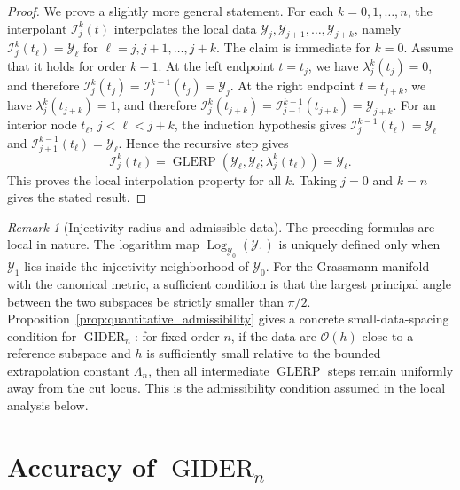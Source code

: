 \documentclass[a4paper,11pt]{article}
\newcommand{\Log}{\operatorname{Log}}
\newcommand{\GLERP}{\operatorname{GLERP}}
\newcommand{\GIDER}{\operatorname{GIDER}}
\numberwithin{equation}{section}
\theoremstyle{plain}
\theoremstyle{definition}
\theoremstyle{remark}
\newtheorem{remark}[thm]{Remark}
\begin{document}
\begin{proof}
We prove a slightly more general statement.  For each \(k=0,1,\ldots,n\), the interpolant \(\mathcal{I}_j^k(t)\) interpolates the local data \(\mathcal{Y}_j,\mathcal{Y}_{j+1},\ldots,\mathcal{Y}_{j+k}\), namely \(\mathcal{I}_j^k(t_\ell)=\mathcal{Y}_\ell\) for \(\ell=j,j+1,\ldots,j+k\).  The claim is immediate for \(k=0\).  Assume that it holds for order \(k-1\).  At the left endpoint \(t=t_j\), we have \(\lambda_j^k(t_j)=0\), and therefore \(\mathcal{I}_j^k(t_j)=\mathcal{I}_j^{k-1}(t_j)=\mathcal{Y}_j\).  At the right endpoint \(t=t_{j+k}\), we have \(\lambda_j^k(t_{j+k})=1\), and therefore \(\mathcal{I}_j^k(t_{j+k})=\mathcal{I}_{j+1}^{k-1}(t_{j+k})=\mathcal{Y}_{j+k}\).  For an interior node \(t_\ell\), \(j<\ell<j+k\), the induction hypothesis gives \(\mathcal{I}_j^{k-1}(t_\ell)=\mathcal{Y}_\ell\) and \(\mathcal{I}_{j+1}^{k-1}(t_\ell)=\mathcal{Y}_\ell\).  Hence the recursive step gives
\[
    \mathcal{I}_j^k(t_\ell)
    =
    \GLERP(\mathcal{Y}_\ell,\mathcal{Y}_\ell;\lambda_j^k(t_\ell))
    =
    \mathcal{Y}_\ell.
\]
This proves the local interpolation property for all \(k\).  Taking \(j=0\) and \(k=n\) gives the stated result.
\end{proof}

\begin{remark}[Injectivity radius and admissible data]\label{rem:injectivity_gider}
The preceding formulas are local in nature.  The logarithm map \(\Log_{\mathcal{Y}_0}(\mathcal{Y}_1)\) is uniquely defined only when \(\mathcal{Y}_1\) lies inside the injectivity neighborhood of \(\mathcal{Y}_0\).  For the Grassmann manifold with the canonical metric, a sufficient condition is that the largest principal angle between the two subspaces be strictly smaller than \(\pi/2\).  Proposition~\ref{prop:quantitative_admissibility} gives a concrete small-data-spacing condition for \(\GIDER_n\): for fixed order \(n\), if the data are \(\mathcal{O}(h)\)-close to a reference subspace and \(h\) is sufficiently small relative to the bounded extrapolation constant \(\Lambda_n\), then all intermediate \(\GLERP\) steps remain uniformly away from the cut locus.  This is the admissibility condition assumed in the local analysis below.
\end{remark}

%
\section{Accuracy of \texorpdfstring{\(\GIDER_n\)}{GIDERn}}\label{sec:accuracy}
\end{document}
